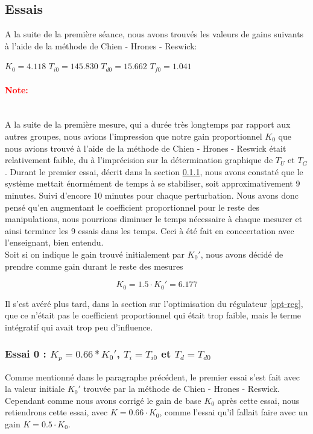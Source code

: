 \subsection{Essais}
A la suite de la première séance, nous avons trouvés les valeurs de gains suivants
à l'aide de la méthode de Chien - Hrones - Reswick:

\begin{center}
    $K_0  = 4.118$
    \hspace{1cm}
    $T_{i0} = 145.830$
    \hspace{1cm}
    $T_{d0} = 15.662$
    \hspace{1cm}
    $T_{f0} = 1.041$
\end{center}

\paragraph{\textcolor{red}{Note:}}\mbox{}\\
A la suite de la première mesure, qui a durée très longtemps par rapport aux autres groupes,
nous avions l'impression que notre gain proportionnel $K_0$ que nous avions trouvé à l'aide de la méthode de 
Chien - Hrones - Reswick était relativement faible, du à l'imprécision sur la détermination graphique 
de $T_{U}$ et $T_{G}$. Durant le premier essai, décrit dans la section \ref{essai-0}, nous avons constaté que 
le système mettait énormément de temps à se stabiliser, soit approximativement 9 minutes. Suivi d'encore 10 minutes
pour chaque perturbation. Nous avons donc pensé qu'en augmentant le coefficient proportionnel pour le
reste des manipulations, nous pourrions diminuer le temps nécessaire à chaque mesurer et ainsi terminer les 9 essais dans les temps.
Ceci à été fait en conecertation avec l'enseignant, bien entendu.\\

Soit si on indique le gain trouvé initialement par $K_0'$, nous avons décidé de 
prendre comme gain durant le reste des mesures 

$$K_0 = 1.5 \cdot K_0' = 6.177$$

Il s'est avéré plus tard, dans la section sur l'optimisation du régulateur \ref{opt-reg}, que ce n'était pas
le coefficient proportionnel qui était trop faible, mais le terme intégratif qui avait trop peu d'influence.


\pagebreak
\subsubsection{Essai 0 : $K_{p} = 0.66*K_{0}'$, $T_{i} = T_{i0}$ et $T_{d} = T_{d0}$} \label{essai-0}
Comme mentionné dans le paragraphe précédent, le premier essai s'est fait avec
la valeur initiale $K_0'$ trouvée par la méthode de Chien - Hrones - Reswick.
Cependant comme nous avons corrigé le gain de base $K_0$ après cette essai, nous
retiendrons cette essai, avec $K = 0.66 \cdot K_0$, comme l'essai qu'il fallait
faire avec un gain $K = 0.5 \cdot K_0$.

